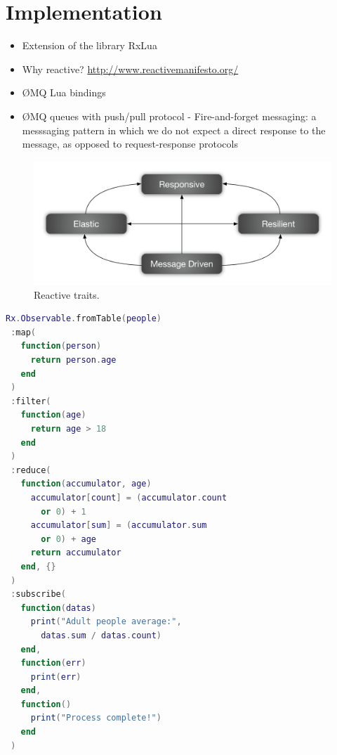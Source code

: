 \section{Implementation}
\label{sec:implementation}

\begin{itemize}
  \item Extension of the library RxLua
  \item Why reactive?
    \url{http://www.reactivemanifesto.org/}
  \item ØMQ Lua bindings
  \item ØMQ queues with push/pull protocol - Fire-and-forget messaging: a messsaging pattern in which we do not expect a direct response to the message, as opposed to request-response protocols
\end{itemize}




\begin{figure}[t!]
  \centering
  \includegraphics[width=.99\linewidth]{images/reactive-traits}
  \caption{Reactive traits.}
  \label{fig:reactive-traits}
\end{figure}


\begin{minipage}{\linewidth}
\begin{lstlisting}[language=LUA,caption={Process pipeline example, using the library RxLua},label=pipeline-example]
Rx.Observable.fromTable(people)
 :map(
   function(person)
     return person.age
   end
 )
 :filter(
   function(age)
     return age > 18
   end
 )
 :reduce(
   function(accumulator, age)
     accumulator[count] = (accumulator.count
       or 0) + 1
     accumulator[sum] = (accumulator.sum
       or 0) + age
     return accumulator
   end, {}
 )
 :subscribe(
   function(datas)
     print("Adult people average:",
       datas.sum / datas.count)
   end,
   function(err)
     print(err)
   end,
   function()
     print("Process complete!")
   end
 )
\end{lstlisting}
\end{minipage}
